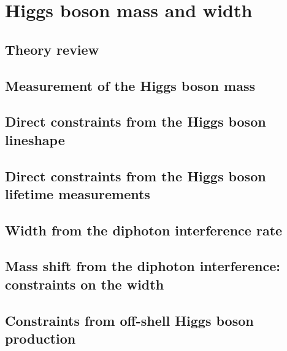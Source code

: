 \documentclass[../report.tex]{subfiles}
\providecommand{\main}{..}
\begin{document}
\section{Higgs boson mass and width}\label{sec5}

\subsection{Theory review}



\subsection{Measurement of the Higgs boson mass}

\subsection{Direct constraints from the Higgs boson lineshape}
\label{sec:5_mass}

\subsection{Direct constraints from the Higgs boson lifetime measurements}
\label{sec:5_lifetime}

\subsection{Width from the diphoton interference rate}
\label{sec:5_interference_real}

\subsection{Mass shift from the diphoton interference: constraints on the width}

\label{sec:5_interference_imag}

\subsection{Constraints from off-shell Higgs boson production}

\label{sec:5_offshell}

%
%
\end{document}
